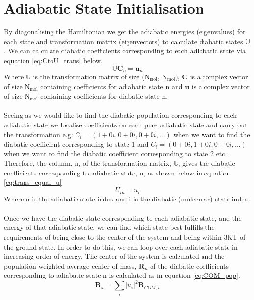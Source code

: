 \chapter{Adiabatic State Initialisation}
\label{ap:AdiabaticSelector}
By diagonalising the Hamiltonian we get the adiabatic energies (eigenvalues) for each state and transformation matrix (eigenvectors) to calculate diabatic states $\mathbb{U}$. We can calculate diabatic coefficients corresponding to each adiabatic state via equation \eqref{eq:CtoU_trans} below.
\begin{equation}
	\mathbb{U} \mathbf{C}_{n} = \mathbf{u}_{n}
	\label{eq:CtoU_trans}
\end{equation}
Where $\mathbb{U}$ is the transformation matrix of size (N$_{\text{mol}}$,  N$_{\text{mol}}$), $\mathbf{C}$ is a complex vector of size N$_{\text{mol}}$ containing coefficients for adiabatic state n and $\mathbf{u}$ is a complex vector of size N$_{\text{mol}}$ containing coefficients for diabatic state n.
\\\\
Seeing as we would like to find the diabatic population corresponding to each adiabatic state we localise coefficients on each pure adiabatic state and carry out the transformation e.g: $C_i = (1+0i, 0+0i, 0+0i, ...)$ when we want to find the diabatic coefficient corresponding to state 1 and $C_i = (0+0i, 1+0i, 0+0i, ...     )$ when we want to find the diabatic coefficient corresponding to state 2 etc.. Therefore, the column, n, of the transformation matrix, $\mathbb{U}$, gives the diabatic coefficients corresponding to adiabatic state, n, as shown below in equation \eqref{eq:trans_equal_u}
\begin{equation}
	U_{in} = u_{i}
	\label{eq:trans_equal_u}
\end{equation}
Where n is the adiabatic state index and i is the diabatic (molecular) state index.
\\\\
Once we have the diabatic state corresponding to each adiabatic state, and the energy of that adiabatic state, we can find which state best fulfills the requirements of being close to the center of the system and being within 3KT of the ground state. In order to do this, we can loop over each adiabatic state in increasing order of energy. The center of the system is calculated and the population weighted average center of mass, $\mathbf{R}_n$ of the diabatic coefficients corresponding to adiabatic state n is calculated as in equation \eqref{eq:COM_pop}.
\begin{equation}
	\mathbf{R}_{n} = \sum_{i} |u_{i}|^2 \mathbf{R}_{COM, i}
	\label{eq:COM_pop}
\end{equation}

